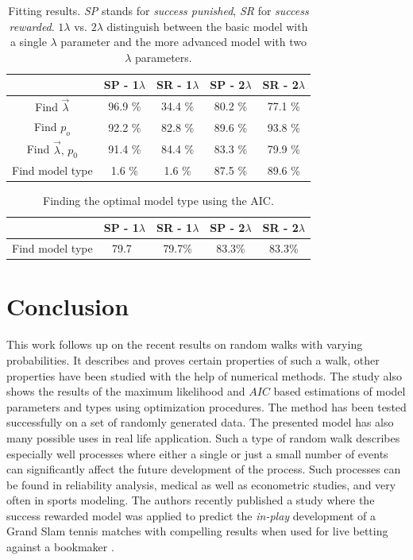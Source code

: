 \documentclass{amsart}
\theoremstyle{definition}
\theoremstyle{plain}
\theoremstyle{plain}
\numberwithin{equation}{section}
\begin{document}
\begin{table}

\begin{centering}
{\caption{\label{tab:Fitting-results}Fitting results. \emph{SP }stands for
\emph{success punished}, \emph{SR} for \emph{success rewarded}. $1\lambda$
vs. $2\lambda$ distinguish between the basic model with a single
$\lambda$ parameter and the more advanced model with two $\lambda$ parameters.}}
\begin{tabular}{|c|c|c|c|c|}
\hline 


 & SP - 1$\lambda$ & SR - 1$\lambda$ & SP - 2$\lambda$ & SR - 2$\lambda$\tabularnewline
\hline 
\hline 
Find $\overrightarrow{\lambda}$ & 96.9 \% & 34.4 \% & 80.2 \% & 77.1 \%\tabularnewline
\hline 
Find $p_{o}$ & 92.2 \% & 82.8 \% & 89.6 \% & 93.8 \%\tabularnewline
\hline 
Find $\overrightarrow{\lambda},\,p_{0}$ & 91.4 \% & 84.4 \% & 83.3 \% & 79.9 \%\tabularnewline
\hline 
Find model type & 1.6 \% & 1.6 \% & 87.5 \% & 89.6 \%\tabularnewline
\hline 
\end{tabular}
\par\end{centering}
\end{table}

\begin{table}
\centering{}%

{\caption{\label{tab:Fitting-results-Akaike}Finding the optimal model type
using the AIC.}
\begin{tabular}{|c|c|c|c|c|}
\hline 
 & SP - 1$\lambda$ & SR - 1$\lambda$ & SP - 2$\lambda$ & SR - 2$\lambda$\tabularnewline
\hline 
\hline 
Find model type & 
79.7\
 & 
79.7\%
 & 
83.3\%
 & 
83.3\%
\tabularnewline
\hline 
\end{tabular}

}
\end{table}

\section{Conclusion\label{sec:Conclusion}}

This work follows up on the recent results on random walks with varying
probabilities. It describes and proves certain properties of such
a walk, other properties have been studied with the help of numerical
methods. The study also shows the results of the maximum likelihood
and $AIC$ based estimations of model parameters and types using optimization
procedures. The method has been tested successfully on a set of randomly
generated data. The presented model has also many possible uses in
real life application. Such a type of random walk describes especially
well processes where either a single or just a small number of events
can significantly affect the future development of the process. Such
processes can be found in reliability analysis, medical as well as
econometric studies, and very often in sports modeling. The authors
recently published a study where the success rewarded model was applied
to predict the \emph{in-play} development of a Grand Slam tennis matches
with compelling results when used for live betting against a bookmaker
\cite{ja2019imam}.
\end{document}
